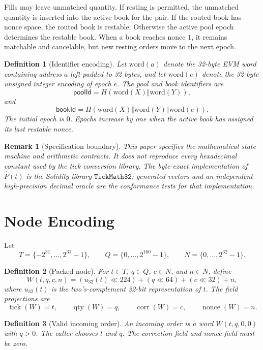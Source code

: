 \documentclass[11pt]{article}
\newtheorem{definition}{Definition}
\newtheorem{remark}{Remark}
\DeclareMathOperator{\tick}{tick}
\DeclareMathOperator{\qty}{qty}
\DeclareMathOperator{\nonce}{nonce}
\DeclareMathOperator{\corr}{corr}
\begin{document}
Fills may leave unmatched quantity.  If resting is permitted, the
unmatched quantity is inserted into the active book for the pair.  If the
routed book has nonce space, the routed book is restable.  Otherwise the
active pool epoch determines the restable book.  When a book reaches
nonce \(1\), it remains matchable and cancelable, but new resting orders
move to the next epoch.

\begin{definition}[Identifier encoding]
Let \(\mathrm{word}(a)\) denote the 32-byte EVM word containing address
\(a\) left-padded to 32 bytes, and let \(\mathrm{word}(e)\) denote the
32-byte unsigned integer encoding of epoch \(e\).  The pool and book
identifiers are
\[
  \mathsf{poolId}=H(\mathrm{word}(X)\Vert\mathrm{word}(Y)),
\]
and
\[
  \mathsf{bookId}=H(\mathrm{word}(X)\Vert\mathrm{word}(Y)\Vert
  \mathrm{word}(e)).
\]
The initial epoch is \(0\).  Epochs increase by one when the active book
has assigned its last restable nonce.
\end{definition}

\begin{remark}[Specification boundary]
This paper specifies the mathematical state machine and arithmetic
contracts.  It does not reproduce every hexadecimal constant used by the
tick conversion library.  The byte-exact implementation of
\(\widehat{P}(t)\) is the Solidity library \(\mathtt{TickMath32}\);
generated vectors and an independent high-precision decimal oracle are
the conformance tests for that implementation.
\end{remark}

\section{Node Encoding}

Let
\[
  T = \{-2^{31},\ldots,2^{31}-1\},
  \qquad
  Q = \{0,\ldots,2^{160}-1\},
  \qquad
  N = \{0,\ldots,2^{32}-1\}.
\]

\begin{definition}[Packed node]
For \(t\in T\), \(q\in Q\), \(c\in N\), and \(n\in N\), define
\[
  W(t,q,c,n)
    = (u_{32}(t) \ll 224) + (q \ll 64) + (c \ll 32) + n,
\]
where \(u_{32}(t)\) is the two's-complement 32-bit representation of
\(t\).  The field projections are
\[
  \tick(W)=t,\qquad \qty(W)=q,\qquad
  \corr(W)=c,\qquad \nonce(W)=n.
\]
\end{definition}

\begin{definition}[Valid incoming order]
An incoming order is a word \(W(t,q,0,0)\) with \(q>0\).  The caller
chooses \(t\) and \(q\).  The correction field and nonce field must be
zero.
\end{definition}
\end{document}
